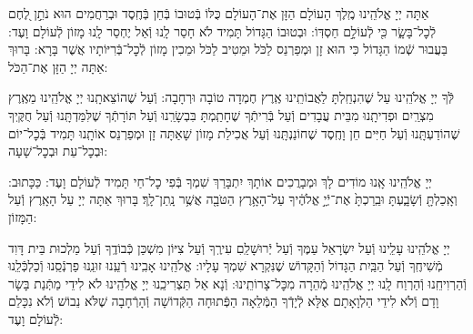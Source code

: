 \documentclass[twoside, openany, parskip=half, 11pt]{book}
\begin{document}
\nextpage
{}
אַתָּה יְיָ אֱלֹהֵֽינוּ מֶֽלֶךְ הָעוֹלָם הַזָּן אֶת־הָעוֹלָם כֻּלּוֹ בְּֿטוּבוֹ בְּֿחֵן בְּֿחֶֽסֶד וּבְרַחֲמִים הוּא נֹתֵ֣ן לֶ֭חֶם לְֿכׇל־בָּשָׂ֑ר כִּ֖י לְֿעוֹלָ֣ם חַסְדּֽוֹ: וּבְטוּבוֹ הַגָּדוֹל תָּמִיד לֹא חָסַר לָֽנוּ וְֿאַל יֶחְסַר לָֽנוּ מָזוֹן לְֿעוֹלָם וָעֶד: בַּעֲבוּר שְֿׁמוֹ הַגָּדוֹל כִּי הוּא זָן וּמְפַרְנֵס לַכֹּל וּמֵטִיב לַכֹּל וּמֵכִין מָזוֹן לְֿכׇל־בְּֿרִיּוֹתָיו אֲשֶׁר בָּרָא: בָּרוּךְ אַתָּה יְיָ הַזָּן אֶת־הַכֹּל:



לְּֿךָ יְיָ אֱלֹהֵֽינוּ עַל שֶׁהִנְחַֽלְתָּ לַאֲבוֹתֵֽינוּ אֶֽרֶץ חֶמְדָה טוֹבָה וּרְחָבָה: וְֿעַל שֶׁהוֹצֵאתָֽנוּ יְיָ אֱלֹהֵֽינוּ מֵאֶֽרֶץ מִצְרַֽיִם וּפְדִיתָֽנוּ מִבֵּית עֲבָדִים וְֿעַל בְּֿרִיתְֿךָ שֶׁחָתַֽמְתָּ בִּבְשָׂרֵֽנוּ וְֿעַל תּוֹרָתְֿךָ שֶׁלִּמַּדְתָּֽנוּ וְֿעַל חֻקֶּֽיךָ שֶׁהוֹדַעְתָּֽנוּ וְֿעַל חַיִּים חֵן וָחֶֽסֶד שֶׁחוֹנַנְתָּֽנוּ וְֿעַל אֲכִילַת מָזוֹן שָׁאַתָּה זָן וּמְפַרְנֵס אוֹתָֽנוּ תָּמִיד בְּֿכׇל־יוֹם וּבְכׇל־עֵת וּבְכׇל־שָׁעָה:


\alhanisim

יְיָ אֱלֹהֵֽינוּ אָֽנוּ מוֹדִים לָךְ וּמְבָרֲכִים אוֹתָךְ יִתְבָּרַךְ שִׁמְךָ בְּֿפִי כׇל־חַי תָּמִיד לְֿעוֹלָם וָעֶד: כַּכָּתוּב: וְאָֽכַלְתָּ֖ וְֿשָׂבָ֑עְתָּ וּבֵֽרַכְתָּ֙ אֶת־יְֿיָ֣ אֱלֹהֶ֔יךָ עַל־הָאָ֥רֶץ הַטֹּבָ֖ה אֲשֶׁ֥ר נָֽתַן־לָֽךְ׃ בָּרוּךְ אַתָּה יְיָ עַל הָאָֽרֶץ וְֿעַל הַמָּזוֹן:



יְיָ אֱלֹהֵֽינוּ עָלֵֽינוּ וְֿעַל יִשְׂרָאֵל עַמֶּךָ וְֿעַל יְֿרוּשָׁלַֽםִ עִירֶֽךָ וְֿעַל צִיּוֹן מִשְׁכַּן כְּֿבוֹדֶֽךָ וְֿעַל מַלְכוּת בֵּית דָּוִד מְֿשִׁיחֶֽךָ וְֿעַל הַבַּֽיִת הַגָּדוֹל וְֿהַקָּדוֹשׁ שֶׁנִּקְרָא שִׁמְךָ עָלָיו: אֱלֹהֵֽינוּ אָבִֽינוּ רְֿעֵֽנוּ זוּנֵֽנוּ פַרְנְֿסֵֽנוּ וְֿכַלְכְּֿלֵֽנוּ וְֿהַרְוִיחֵֽנוּ וְֿהַרְוַח לָֽנוּ יְיָ אֱלֹהֵֽינוּ מְֿהֵרָה מִכׇּל־צָרוֹתֵֽינוּ: וְֿנָא אַל תַּצְרִיכֵֽנוּ יְיָ אֱלֹהֵֽינוּ לֹא לִידֵי מַתְּֿנַת בָּשָׂר וָדָם וְֿלֹא לִידֵי הַלְוָאָתָם אֶלָּא לְֿיָדְֿךָ הַמְּֿלֵאָה הַפְּֿתוּחָה הַקְּֿדוֹשָׁה וְֿהָרְֿחָבָה שֶׁלֹּא נֵבוֹשׁ וְֿלֹא נִכָּלֵם לְֿעוֹלָם וָעֶד:

\enlargethispage{\baselineskip}
\end{document}
